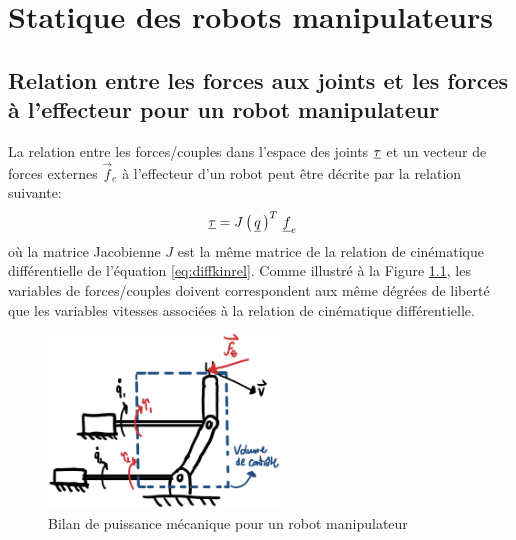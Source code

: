 \chapter{Statique des robots manipulateurs}
\label{sec:static}


\section{Relation entre les forces aux joints et les forces à l'effecteur pour un robot manipulateur}
\label{sec:manipstatic}

La relation entre les forces/couples dans l'espace des joints $\underline{\tau}$ et un vecteur de forces externes $\vec{f}_e$ à l'effecteur d'un robot peut être décrite par la relation suivante:
\begin{align}
\underline{\tau} &= J\left( \, \underline{q} \, \right)^T \, \underline{f}_e 
\label{eq:staticmanipulator}
\end{align}
où la matrice Jacobienne $J$ est la même matrice de la relation de cinématique différentielle de l'équation \ref{eq:diffkinrel}. Comme illustré à la Figure \ref{fig:controlvolume}, les variables de forces/couples doivent correspondent aux même dégrées de liberté que les variables vitesses associées à la relation de cinématique différentielle. 
\begin{figure}[H]
	\centering
		\includegraphics[width=0.55\textwidth]{fig/controlvolume.jpg}
	\caption{Bilan de puissance mécanique pour un robot manipulateur}
	\label{fig:controlvolume}
\end{figure}


